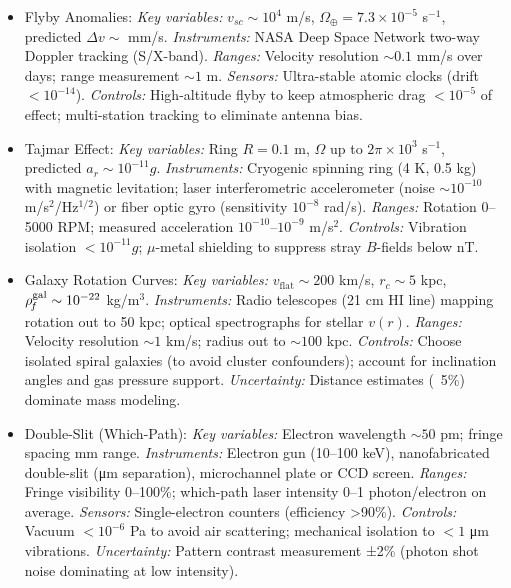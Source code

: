 \documentclass[11pt]{article}
\begin{document}
\begin{itemize}

\item 
Flyby Anomalies: \textit{Key variables:} $v_{sc}\sim 10^4$ m/s, $\Omega_{\oplus}=7.3\times10^{-5}$ s$^{-1}$, predicted $\Delta v \sim$ mm/s. \textit{Instruments:} NASA Deep Space Network two-way Doppler tracking (S/X-band). \textit{Ranges:} Velocity resolution $\sim 0.1$ mm/s over days; range measurement $\sim 1$ m. \textit{Sensors:} Ultra-stable atomic clocks (drift $<10^{-14}$). \textit{Controls:} High-altitude flyby to keep atmospheric drag $<10^{-5}$ of effect; multi-station tracking to eliminate antenna bias.




\item 
Tajmar Effect: \textit{Key variables:} Ring $R=0.1$ m, $\Omega$ up to $2\pi\times10^3$ s$^{-1}$, predicted $a_r \sim10^{-11}g$. \textit{Instruments:} Cryogenic spinning ring (4 K, 0.5 kg) with magnetic levitation; laser interferometric accelerometer (noise $\sim10^{-10}$ m/s$^2$/Hz$^{1/2}$) or fiber optic gyro (sensitivity $10^{-8}$ rad/s). \textit{Ranges:} Rotation 0–5000 RPM; measured acceleration $10^{-10}$–$10^{-9}$ m/s$^2$. \textit{Controls:} Vibration isolation $<10^{-11}g$; $\mu$-metal shielding to suppress stray $B$-fields below nT.




\item 
Galaxy Rotation Curves: \textit{Key variables:} $v_{\text{flat}}\sim200$ km/s, $r_c\sim5$ kpc, $\rho_{\!f}^{\text{gal}}\sim10^{-22}$ kg/m$^3$. \textit{Instruments:} Radio telescopes (21 cm HI line) mapping rotation out to 50 kpc; optical spectrographs for stellar $v(r)$. \textit{Ranges:} Velocity resolution $\sim1$ km/s; radius out to $\sim100$ kpc. \textit{Controls:} Choose isolated spiral galaxies (to avoid cluster confounders); account for inclination angles and gas pressure support. \textit{Uncertainty:} Distance estimates (~5\%) dominate mass modeling.




\item 
Double-Slit (Which-Path): \textit{Key variables:} Electron wavelength $\sim50$ pm; fringe spacing mm range. \textit{Instruments:} Electron gun (10–100 keV), nanofabricated double-slit (μm separation), microchannel plate or CCD screen. \textit{Ranges:} Fringe visibility 0–100\%; which-path laser intensity 0–1 photon/electron on average. \textit{Sensors:} Single-electron counters (efficiency >90\%). \textit{Controls:} Vacuum $<10^{-6}$ Pa to avoid air scattering; mechanical isolation to $<1$ μm vibrations. \textit{Uncertainty:} Pattern contrast measurement ±2\% (photon shot noise dominating at low intensity).





\end{itemize}
\end{document}
